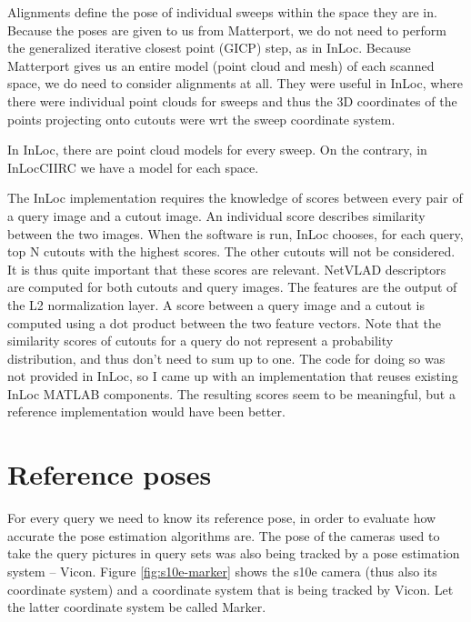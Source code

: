 \documentclass[twoside]{ctuthesis}
\theoremstyle{plain}
\theoremstyle{definition}
\theoremstyle{note}
\begin{document}
Alignments define the pose of individual sweeps within the space they are in. Because the poses are given to us from Matterport, we do not need to perform the generalized iterative closest point (GICP) step, as in InLoc. Because Matterport gives us an entire model (point cloud and mesh) of each scanned space, we do need to consider alignments at all. They were useful in InLoc, where there were individual point clouds for sweeps and thus the 3D coordinates of the points projecting onto cutouts were wrt the sweep coordinate system.

In InLoc, there are point cloud models for every sweep. On the contrary, in InLocCIIRC we have a model for each space.

The InLoc implementation requires the knowledge of scores between every pair of a query image and a cutout image. An individual score describes similarity between the two images. When the software is run, InLoc chooses, for each query, top N cutouts with the highest scores. The other cutouts will not be considered. It is thus quite important that these scores are relevant. NetVLAD \cite{Arandjelovic16} descriptors are computed for both cutouts and query images. The features are the output of the L2 normalization layer. A score between a query image and a cutout is computed using a dot product between the two feature vectors. Note that the similarity scores of cutouts for a query do not represent a probability distribution, and thus don't need to sum up to one. The code for doing so was not provided in InLoc, so I came up with an implementation that reuses existing InLoc MATLAB components. The resulting scores seem to be meaningful, but a reference implementation would have been better.

\section{Reference poses}
\label{section:reference-poses}
For every query we need to know its reference pose, in order to evaluate how accurate the pose estimation algorithms are. The pose of the cameras used to take the query pictures in query sets was also being tracked by a pose estimation system -- Vicon. Figure \ref{fig:s10e-marker} shows the s10e camera (thus also its coordinate system) and a coordinate system that is being tracked by Vicon. Let the latter coordinate system be called Marker. 
\end{document}

